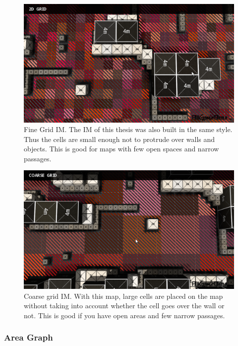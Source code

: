 \documentclass[]{report}
\begin{document}
	\begin{figure}[h!]
		\centering
		\includegraphics[width=0.8\linewidth]{Images/screenshot001_2dGrid}
		\caption[Fine Grid influence map]{Fine Grid \ac{IM}. The \ac{IM} of this thesis was also built in the same style. Thus the cells are small enough not to protrude over walls and objects. This is good for maps with few open spaces and narrow passages. \citep{gameDevInfluenceMap} \citep{imPathfinding}}
		\label{fig:screenshot0012dgrid}
	\end{figure}
	\begin{figure}[h!]
		\centering
		\includegraphics[width=0.8\linewidth]{Images/screenshot001_2dGrid2}
		\caption[Coarse grid influence map.]{Coarse grid \ac{IM}. With this map, large cells are placed on the map without taking into account whether the cell goes over the wall or not. This is good if you have open areas and few narrow passages. \citep{gameDevInfluenceMap} \citep{imPathfinding}}
		\label{fig:screenshot0012dgrid2}
	\end{figure}
	
	\newpage
	\subsubsection{Area Graph}
	
\end{document}
